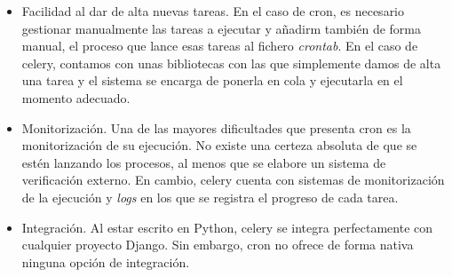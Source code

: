 \begin{itemize}
\item Facilidad al dar de alta nuevas tareas. En el caso de cron, es necesario
  gestionar manualmente las tareas a ejecutar y añadirm también de forma manual,
  el proceso que lance esas tareas al fichero \textit{crontab}. En el caso de
  celery, contamos con unas bibliotecas con las que simplemente damos de alta
  una tarea y el sistema se encarga de ponerla en cola y ejecutarla en el
  momento adecuado.

\item Monitorización. Una de las mayores dificultades que presenta cron es la
  monitorización de su ejecución. No existe una certeza absoluta de que se estén
  lanzando los procesos, al menos que se elabore un sistema de verificación
  externo. En cambio, celery cuenta con sistemas de monitorización de la
  ejecución y \textit{logs} en los que se registra el progreso de cada tarea.

\item Integración. Al estar escrito en Python, celery se integra perfectamente
  con cualquier proyecto Django. Sin embargo, cron no ofrece de forma nativa
  ninguna opción de integración.

\end{itemize}

